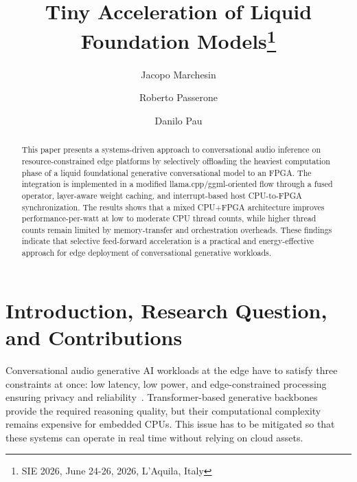 \documentclass[runningheads]{llncs}
\begin{document}
%
\title{Tiny Acceleration of Liquid Foundation Models\thanks{SIE 2026, June 24-26, 2026, L'Aquila, Italy}}
%
%
\author{Jacopo Marchesin \and
Roberto Passerone \and
Danilo Pau}
%
%

%
\maketitle              %
%
\begin{abstract}
  This paper presents a systems-driven approach to conversational audio
  inference on resource-constrained edge platforms by selectively offloading
  the heaviest computation phase of a liquid foundational generative
  conversational model to an FPGA.
  The integration is implemented in a modified llama.cpp/ggml-oriented flow
  through a fused operator, layer-aware weight caching, and interrupt-based
  host CPU-to-FPGA synchronization.
  The results shows that a mixed CPU+FPGA architecture improves
  performance-per-watt at low to moderate CPU thread counts, while higher
  thread counts remain limited by memory-transfer and orchestration overheads.
  These findings indicate that selective feed-forward acceleration is a
  practical and energy-effective approach for edge deployment of
  conversational generative workloads.

\end{abstract}

\section{Introduction, Research Question, and Contributions}\label{sec:intro}
Conversational audio generative AI workloads at the edge have to satisfy three
constraints at once: low latency, low power, and edge-constrained processing
ensuring privacy and reliability~\cite{reddi2025generative}.
Transformer-based generative backbones provide the required reasoning quality,
but their computational complexity remains expensive for embedded CPUs.
This issue has to be mitigated so that these systems can operate in real time
without relying on cloud assets.
\end{document}

